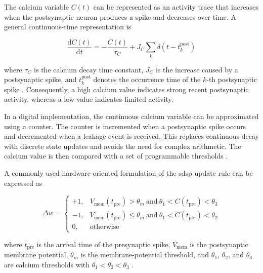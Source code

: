 The calcium variable \(C(t)\) can be represented as an activity trace that increases when the postsynaptic neuron produces a spike and decreases over time. A general continuous-time representation is

\begin{equation}
    \frac{\mathrm{d}C(t)}{\mathrm{d}t}
    =
    -\frac{C(t)}{\tau_C}
    +
    J_C \sum_{k}
    \delta\left(t-t_k^{\mathrm{post}}\right)
    \label{eq:calcium-dynamics}
\end{equation}

where \(\tau_C\) is the calcium decay time constant, \(J_C\) is the increase caused by a postsynaptic spike, and \(t_k^{\mathrm{post}}\) denotes the occurrence time of the \(k\)-th postsynaptic spike \cite{Brader2007}. Consequently, a high calcium value indicates strong recent postsynaptic activity, whereas a low value indicates limited activity.

In a digital implementation, the continuous calcium variable can be approximated using a counter. The counter is incremented when a postsynaptic spike occurs and decremented when a leakage event is received. This replaces continuous decay with discrete state updates and avoids the need for complex arithmetic. The calcium value is then compared with a set of programmable thresholds \cite{Frenkel2019ODIN}.

A commonly used hardware-oriented formulation of the \gls{sdsp} update rule can be expressed as

\begin{equation}
    \Delta w
    =
    \begin{cases}
        +1,
        & V_{\mathrm{mem}}\left(t_{\mathrm{pre}}\right) > \theta_m
          \ \text{and}\
          \theta_1 < C\left(t_{\mathrm{pre}}\right) < \theta_3
        \\[2pt]
        -1,
        & V_{\mathrm{mem}}\left(t_{\mathrm{pre}}\right) \leq \theta_m
          \ \text{and}\
          \theta_1 < C\left(t_{\mathrm{pre}}\right) < \theta_2
        \\[2pt]
        0,
        & \text{otherwise}
    \end{cases}
    \label{eq:sdsp-weight-update}
\end{equation}

where \(t_{\mathrm{pre}}\) is the arrival time of the presynaptic spike, \(V_{\mathrm{mem}}\) is the postsynaptic membrane potential, \(\theta_m\) is the membrane-potential threshold, and \(\theta_1\), \(\theta_2\), and \(\theta_3\) are calcium thresholds with \(\theta_1 < \theta_2 < \theta_3\) \cite{Frenkel2019ODIN}.

